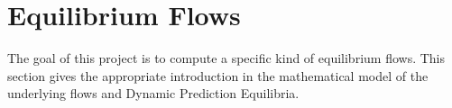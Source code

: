 \documentclass[titlepage]{scrartcl}
\theoremstyle{definition}
\begin{document}
    \clearpage
    

    \clearpage
    \section{Equilibrium Flows}\label{sec:equilibrium-flows}

    The goal of this project is to compute a specific kind of equilibrium flows.
    This section gives the appropriate introduction in the mathematical model of the underlying flows and Dynamic Prediction Equilibria.
    
    
    

    \clearpage
    
    
    \clearpage
    

    \clearpage
    \printbibliography
\end{document}
